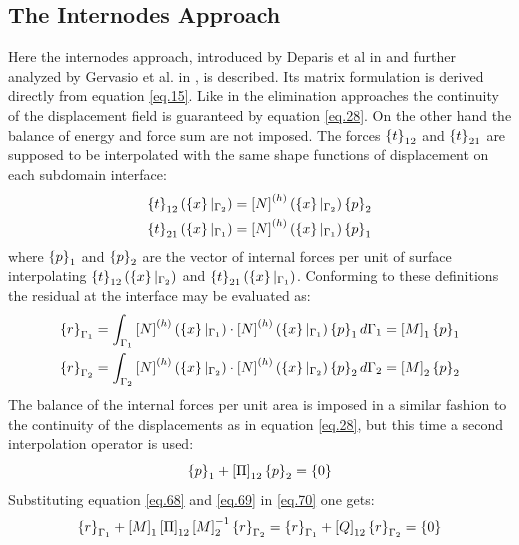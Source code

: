 \subsection{The Internodes Approach}\label{ssec35}
Here the internodes approach, introduced by Deparis et al in \cite{deparis2016internodes} and further analyzed by Gervasio et al. in \cite{gervasio2016analysis}, is described. Its matrix formulation is derived directly from equation \eqref{eq.15}. Like in the elimination approaches the continuity of the displacement field is guaranteed by equation \eqref{eq.28}. On the other hand the balance of energy and force sum are not imposed. The forces $\left\lbrace{t}\right \rbrace_{12}$ and $\left\lbrace{t}\right \rbrace_{21}$ are supposed to be interpolated with the same shape functions of displacement  on each subdomain interface:
\begin{eqnarray}
\label{eq.66}
 \left\lbrace{t}\right \rbrace_{12}(\left\lbrace{x}\right \rbrace|_{\Gamma_2})=\left[{N}\right]^{(h)}(\left\lbrace{x}\right \rbrace|_{\Gamma_2}) \left\lbrace{p}\right \rbrace_{2}\\
 \label{eq.67}
 \left\lbrace{t}\right \rbrace_{21}(\left\lbrace{x}\right \rbrace|_{\Gamma_1})=\left[{N}\right]^{(h)}(\left\lbrace{x}\right \rbrace|_{\Gamma_1}) \left\lbrace{p}\right \rbrace_{1}
\end{eqnarray}
where $\left\lbrace{p}\right \rbrace_{1}$ and $\left\lbrace{p}\right \rbrace_{2}$ are the vector of internal forces per unit of surface interpolating $\left\lbrace{t}\right \rbrace_{12}(\left\lbrace{x}\right \rbrace|_{\Gamma_2})$ and $ \left\lbrace{t}\right \rbrace_{21}(\left\lbrace{x}\right \rbrace|_{\Gamma_1})$.
Conforming to these definitions the residual at the interface may be evaluated as:
\begin{eqnarray}
\label{eq.68}
 \left\lbrace{r}\right \rbrace_{\Gamma_1}=\int_{\Gamma_1}\left[{N}\right]^{(h)}(\left\lbrace{x}\right \rbrace|_{\Gamma_1})\cdot\left[{N}\right]^{(h)}(\left\lbrace{x}\right \rbrace|_{\Gamma_1}) \left\lbrace{p}\right \rbrace_{1}d\Gamma_1=\left[{M}\right]_1\left\lbrace{p}\right \rbrace_{1}\\
 \label{eq.69}
\left\lbrace{r}\right \rbrace_{\Gamma_2}=\int_{\Gamma_2}\left[{N}\right]^{(h)}(\left\lbrace{x}\right \rbrace|_{\Gamma_2})\cdot\left[{N}\right]^{(h)}(\left\lbrace{x}\right \rbrace|_{\Gamma_2}) \left\lbrace{p}\right \rbrace_{2}d\Gamma_2=\left[{M}\right]_2\left\lbrace{p}\right \rbrace_{2}
\end{eqnarray}
The balance of the internal forces per unit area is imposed in a similar fashion to the continuity of the displacements as in equation \eqref{eq.28}, but this time a second interpolation operator is used:
\begin{equation}
\label{eq.70}
\left\lbrace{p}\right \rbrace_{1}+\left[{\Pi}\right]_{12}\left\lbrace{p}\right \rbrace_{2}=\left\lbrace{0}\right \rbrace
\end{equation}
Substituting equation \eqref{eq.68} and \eqref{eq.69} in \eqref{eq.70} one gets:
\begin{equation}
\label{eq.71}
\left\lbrace{r}\right \rbrace_{\Gamma_1}+\left[{M}\right]_1\left[{\Pi}\right]_{12}\left[{M}\right]_2^{-1}\left\lbrace{r}\right \rbrace_{\Gamma_2}=\left\lbrace{r}\right \rbrace_{\Gamma_1}+\left[{Q}\right]_{12}\left\lbrace{r}\right \rbrace_{\Gamma_2}=\left\lbrace{0}\right \rbrace
\end{equation}
